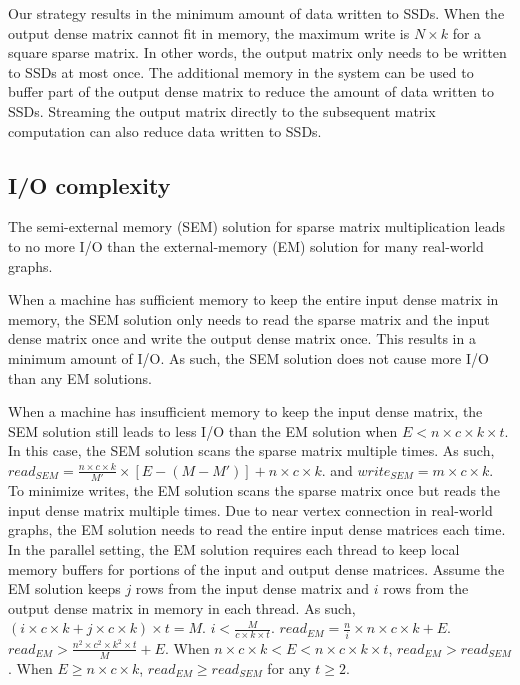 Our strategy results in the minimum amount of data written to SSDs. When the output
dense matrix cannot fit in memory, the maximum write is $N \times k$ for a square
sparse matrix.
In other words, the output matrix only needs to be written to SSDs at most once.
The additional memory in the system can be used to buffer part of the output
dense matrix to reduce the amount of data written to SSDs. Streaming the output
matrix directly to the subsequent matrix computation can also reduce data written
to SSDs.

\subsection{I/O complexity}
The semi-external memory (SEM) solution for sparse matrix multiplication leads
to no more I/O than the external-memory (EM) solution for many real-world graphs.

When a machine has sufficient memory to keep the entire input dense matrix
in memory, the SEM solution only needs to read the sparse matrix and the input
dense matrix once and write the output dense matrix once. This results in
a minimum amount of I/O. As such, the SEM solution does not cause more I/O
than any EM solutions.

When a machine has insufficient memory to keep the input dense matrix, the SEM
solution still leads to less I/O than the EM solution when
$E < n \times c \times k \times t$.
In this case, the SEM solution scans the sparse matrix multiple times. As such,
$read_{SEM} = \frac{n \times c \times k}{M'} \times [E - (M - M')] + n \times c \times k$.
and $write_{SEM} = m \times c \times k$. To minimize writes, the EM solution
scans the sparse matrix once but reads the input dense matrix multiple times.
Due to near vertex connection in real-world graphs, the EM solution needs to
read the entire input dense matrices each time. In the parallel setting,
the EM solution requires each thread to keep local memory buffers for portions
of the input and output dense matrices. Assume the EM solution keeps $j$ rows
from the input dense matrix and $i$ rows from the output dense matrix in memory
in each thread. As such,
$(i \times c \times k + j \times c \times k) \times t = M$.
$i < \frac{M}{c \times k \times t}$.
$read_{EM} = \frac{n}{i} \times n \times c \times k + E$.
$read_{EM} > \frac{n^2 \times c^2 \times k^2 \times t}{M} + E$.
When $n \times c \times k < E < n \times c \times k \times t$, $read_{EM} > read_{SEM}$.
When $E \geq n \times c \times k$, $read_{EM} \geq read_{SEM}$ for any $t \geq 2$.

